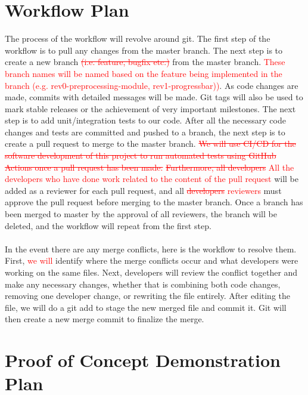 \documentclass{article}
\begin{document}
\section{Workflow Plan}
	
	The process of the workflow will revolve around git. The first step of the workflow is to pull any changes from the master branch. The next step is to create a new branch \textcolor{red}{\sout{(i.e. feature, bugfix etc.)}} from the master branch. \textcolor{red}{These branch names will be named based on the feature being implemented in the branch (e.g. rev0-preprocessing-module, rev1-progressbar))}. As code changes are made, commits with detailed messages will be made. Git tags will also be used to mark stable releases or the achievement of very important milestones. The next step is to add unit/integration tests to our code. After all the necessary code changes and tests are committed and pushed to a branch, the next step is to create a pull request to merge to the master branch.  \textcolor{red}{\sout{We will use CI/CD for the software development of this project to run automated tests using GitHub Actions once a pull request has been made.}} \textcolor{red}{\sout{Furthermore, all developers} All the developers who have done work related to the content of the pull request} will be added as a reviewer for each pull request, and all \textcolor{red}{\sout{developers} reviewers} must approve the pull request before merging to the master branch. Once a branch has been merged to master by the approval of all reviewers, the branch will be deleted, and the workflow will repeat from the first step. 
	\\
	\\
	In the event there are any merge conflicts, here is the workflow to resolve them. First, \textcolor{red}{we will} identify where the merge conflicts occur and what developers were working on the same files. Next, developers will review the conflict together and make any necessary changes, whether that is combining both code changes, removing one developer change, or rewriting the file entirely. After editing the file, we will do a git add to stage the new merged file and commit it. Git will then create a new merge commit to finalize the merge.

\section{Proof of Concept Demonstration Plan}
\end{document}
